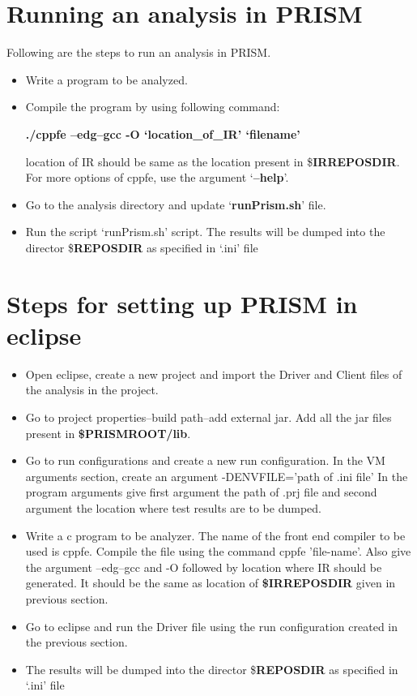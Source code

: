 \documentclass[11pt,a4paper,openright]{report}
\begin{document}
\section{Running an analysis in PRISM}
Following are the steps to run an analysis in PRISM.
\begin{itemize}
 \item Write a program to be analyzed.
 \item Compile the program by using following command:
 
 \textbf{./cppfe --edg--gcc -O `location\_of\_IR' `filename' }
 
 location of IR should be same as the location present in \$\textbf{IRREPOSDIR}. For more options of cppfe, use the argument 
 `\textbf{--help}'.
 
 \item Go to the analysis directory and update `\textbf{runPrism.sh}' file. 
 \item Run the script `runPrism.sh' script. The results will be dumped into the director \$\textbf{REPOSDIR} as specified in `.ini' file
 \end{itemize}

\section{Steps for setting up PRISM in eclipse}
\begin{itemize}
 \item Open eclipse, create a new project and import the Driver and Client files of the analysis in the project.
 \item Go to project properties–build path–add external jar. Add all the jar files present in \textbf{\$PRISMROOT/lib}.
 \item Go to run configurations and create a new run configuration. In the VM arguments section, create an argument -DENVFILE=’path of .ini
file’ In the program arguments give first argument the path of .prj file and second argument the location where test results are to be dumped.
\item Write a c program to be analyzer. The name of the front end compiler to be used is cppfe. Compile the file using the command cppfe ’file-name’.
Also give the argument –edg–gcc and -O followed by location where IR should be generated. It should be the same as location of \textbf{\$IRREPOSDIR} given in
previous section.
\item Go to eclipse and run the Driver file using the run configuration created in the previous section.
\item The results will be dumped into the director \$\textbf{REPOSDIR} as specified in `.ini' file
\end{itemize}
\end{document}
